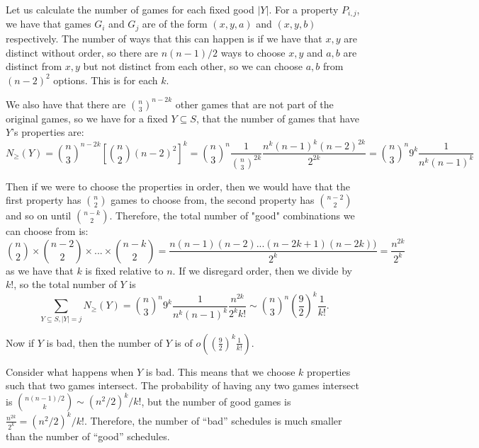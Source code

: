 \documentclass[]{article}
\theoremstyle{definition}
\numberwithin{theorem}{section}
\numberwithin{equation}{section}
\begin{document}
Let us calculate the number of games for each fixed good $|Y|$. For a property $P_{i, j}$, we have that games $G_i$ and $G_j$ are of the form $(x, y, a)$ and $(x, y, b)$ respectively. The number of ways that this can happen is if we have that $x, y$ are distinct without order, so there are $n(n-1)/2$ ways to choose $x, y$ and $a, b$ are distinct from $x, y$ but not distinct from each other, so we can choose $a, b$ from $(n-2)^2$ options. This is for each $k$.

We also have that there are $\binom{n}{3}^{n - 2k}$ other games that are not part of the original games, so we have for a fixed $Y \subseteq S$, that the number of games that have $Y$'s properties are:
\begin{equation}
	N_\geq(Y) = \binom{n}{3}^{n - 2k} \left[ \binom{n}{2} (n - 2)^2 \right]^k = \binom{n}{3}^n \frac{1}{\binom{n}{3}^{2k}} \frac{n^{k} (n - 1)^{k} (n - 2)^{2k}}{2^{2k}} = \binom{n}{3}^n 9^{k} \frac{1}{n^k(n-1)^k}
\end{equation}


Then if we were to choose the properties in order, then we would have that the first property has $\binom{n}{2}$ games to choose from, the second property has $\binom{n-2}{2}$ and so on until $\binom{n-k}{2}$. Therefore, the total number of "good" combinations we can choose from is:
\begin{equation}
	\binom{n}{2} \times \binom{n-2}{2} \times ... \times \binom{n - k}{2} = \frac{n(n -1) (n - 2) ... (n - 2k + 1)(n - 2k))}{2^k} = \frac{n^{2k}}{2^k}
\end{equation}
as we have that $k$ is fixed relative to $n$. 
If we disregard order, then we divide by $k!$, so the total number of $Y$ is
\begin{equation}
	\sum_{Y \subseteq S, |Y| = j} N_\geq(Y) = \binom{n}{3}^n 9^{k} \frac{1}{n^k(n-1)^k}\frac{n^{2k}}{2^k k!} \sim \binom{n}{3}^n \left(\frac{9}{2}\right)^k \frac{1}{k!}.
\end{equation}

Now if $Y$ is bad, then the number of $Y$ is of $o(\left(\frac{9}{2}\right)^k \frac{1}{k!})$.

Consider what happens when $Y$ is bad. This means that we choose $k$ properties such that two games intersect. The probability of having any two games intersect is $\binom{n(n - 1)/2}{k} \sim (n^2/2)^k/k!$, but the number of good games is $\frac{n^{2k}}{2^k} = (n^2/2)^k/ k!$. Therefore, the number of ``bad'' schedules is much smaller than the number of ``good''  schedules.
\end{document}
